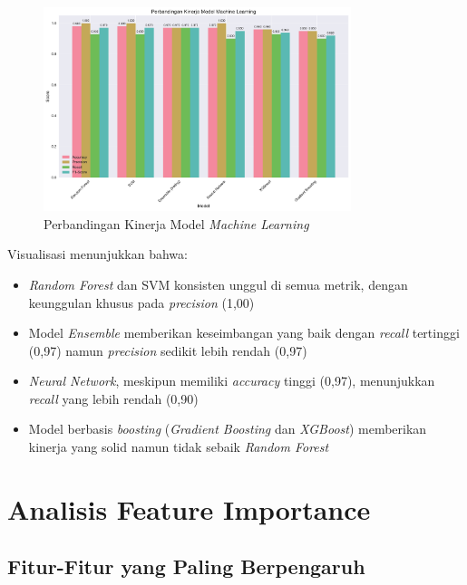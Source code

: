 \begin{figure}[htbp]
    \centering
    \includegraphics[width=0.8\textwidth]{figures/model_performance_comparison.pdf}
    \caption{Perbandingan Kinerja Model \textit{Machine Learning}}
    \label{fig:modelComparison}
\end{figure}

Visualisasi menunjukkan bahwa:
\begin{itemize}
    \item \textit{Random Forest} dan SVM konsisten unggul di semua metrik, dengan keunggulan khusus pada \textit{precision} (1,00)
    \item Model \textit{Ensemble} memberikan keseimbangan yang baik dengan \textit{recall} tertinggi (0,97) namun \textit{precision} sedikit lebih rendah (0,97)
    \item \textit{Neural Network}, meskipun memiliki \textit{accuracy} tinggi (0,97), menunjukkan \textit{recall} yang lebih rendah (0,90)
    \item Model berbasis \textit{boosting} (\textit{Gradient Boosting} dan \textit{XGBoost}) memberikan kinerja yang solid namun tidak sebaik \textit{Random Forest}
\end{itemize}

\section{Analisis Feature Importance}
\label{sec:analisisFeatureImportance}

\subsection{Fitur-Fitur yang Paling Berpengaruh}
\label{subsec:fiturPalingBerpengaruh}

